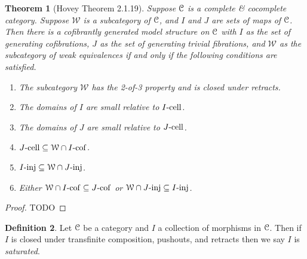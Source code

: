 \documentclass{amsart}
\theoremstyle{plain}
\newtheorem{theorem}{Theorem}[section]
\newtheorem{proposition}[theorem]{Proposition}
\theoremstyle{definition}
\newtheorem{definition}[theorem]{Definition}
\newcommand{\sseq}{\subseteq}
\newcommand{\0}{\mathbf{0}}
\newcommand{\cC}{\mathcal C}
\newcommand{\cW}{\mathcal W}
\renewcommand{\(}{\left(}
\renewcommand{\)}{\right)}
\def\scr{\EuScript}
\def\cC{\scr{C}}
\newcommand{\inj}{\text-\mathrm{inj}}
\newcommand{\cell}{\text-\mathrm{cell}}
\newcommand{\cof}{\text-\mathrm{cof}}
\DeclareMathOperator*{\colim}{colim}
\begin{document}
\begin{theorem}[Hovey Theorem 2.1.19]\label{2.1.19}
  Suppose $\cC$ is a complete \& cocomplete category. Suppose $\cW$ is a subcategory of $\cC$, and $I$ and $J$ are sets of maps of $\cC$. Then there is a cofibrantly generated model structure on $\cC$ with $I$ as the set of generating cofibrations, $J$ as the set of generating trivial fibrations, and $\cW$ as the subcategory of weak equivalences if and only if the following conditions are satisfied.\begin{enumerate}[label=\arabic*.,noitemsep,topsep=0pt]
    \item The subcategory $\cW$ has the 2-of-3 property and is closed under retracts.
    \item The domains of $I$ are small relative to $I\cell$.
    \item The domains of $J$ are small relative to $J\cell$.
    \item $J\cell\sseq\cW\cap I\cof$.
    \item $I\inj\sseq\cW\cap J\inj$.
    \item Either $\cW\cap I\cof\sseq J\cof$ or $\cW\cap J\inj\sseq I\inj$.
  \end{enumerate}
\end{theorem}
\begin{proof}
  TODO
\end{proof}

\begin{definition}\label{saturated}
  Let $\cC$ be a category and $I$ a collection of morphisms in $\cC$. Then if $I$ is closed under transfinite composition, pushouts, and retracts then we say $I$ is \textit{saturated}.
\end{definition}

\end{document}
